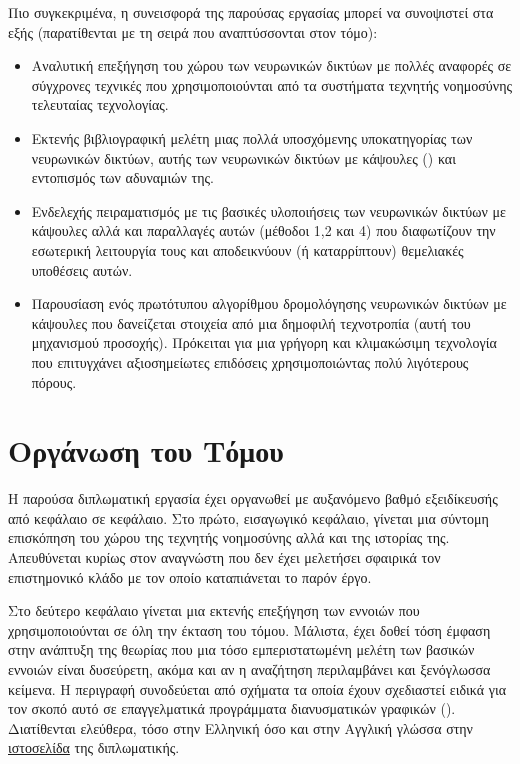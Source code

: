 Πιο συγκεκριμένα, η συνεισφορά της παρούσας εργασίας μπορεί να συνοψιστεί στα εξής (παρατίθενται με τη σειρά που αναπτύσσονται στον τόμο):
\begin{itemize}
  \item Αναλυτική επεξήγηση του χώρου των νευρωνικών δικτύων με πολλές αναφορές σε σύγχρονες τεχνικές που χρησιμοποιούνται από τα συστήματα τεχνητής νοημοσύνης τελευταίας τεχνολογίας.
  \item Εκτενής βιβλιογραφική μελέτη μιας πολλά υποσχόμενης υποκατηγορίας των νευρωνικών δικτύων, αυτής των νευρωνικών δικτύων με κάψουλες () και εντοπισμός των αδυναμιών της.
  \item Ενδελεχής πειραματισμός με τις βασικές υλοποιήσεις των νευρωνικών δικτύων με κάψουλες αλλά και παραλλαγές αυτών (μέθοδοι 1,2 και 4) που διαφωτίζουν την εσωτερική λειτουργία τους και αποδεικνύουν (ή καταρρίπτουν) θεμελιακές υποθέσεις αυτών.
  \item Παρουσίαση ενός πρωτότυπου αλγορίθμου δρομολόγησης νευρωνικών δικτύων με κάψουλες που δανείζεται στοιχεία από μια δημοφιλή τεχνοτροπία (αυτή του μηχανισμού προσοχής). Πρόκειται για μια γρήγορη και κλιμακώσιμη τεχνολογία που επιτυγχάνει αξιοσημείωτες επιδόσεις χρησιμοποιώντας πολύ λιγότερους πόρους.
\end{itemize}

\section{Οργάνωση του Τόμου}
Η παρούσα διπλωματική εργασία έχει οργανωθεί με αυξανόμενο βαθμό εξειδίκευσής από κεφάλαιο σε κεφάλαιο. Στο πρώτο, εισαγωγικό κεφάλαιο, γίνεται μια σύντομη επισκόπηση του χώρου της τεχνητής νοημοσύνης αλλά και της ιστορίας της. Απευθύνεται κυρίως στον αναγνώστη που δεν έχει μελετήσει σφαιρικά τον επιστημονικό κλάδο με τον οποίο καταπιάνεται το παρόν έργο.\par

Στο δεύτερο κεφάλαιο γίνεται μια εκτενής επεξήγηση των εννοιών που χρησιμοποιούνται σε όλη την έκταση του τόμου. Μάλιστα, έχει δοθεί τόση έμφαση στην ανάπτυξη της θεωρίας που μια τόσο εμπεριστατωμένη μελέτη των βασικών εννοιών είναι δυσεύρετη, ακόμα και αν η αναζήτηση περιλαμβάνει και ξενόγλωσσα κείμενα. Η περιγραφή συνοδεύεται από σχήματα τα οποία έχουν σχεδιαστεί ειδικά για τον σκοπό αυτό σε επαγγελματικά προγράμματα διανυσματικών γραφικών (). Διατίθενται ελεύθερα, τόσο στην Ελληνική όσο και στην Αγγλική γλώσσα στην \href{https://github.com/abarmper/Thesis_Barmperis}{ιστοσελίδα} της διπλωματικής.\par

